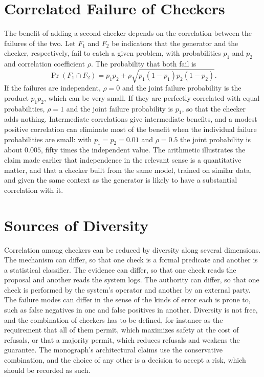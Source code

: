 \section{Correlated Failure of Checkers}

The benefit of adding a second checker depends on the correlation between the failures of the two. Let $F_1$ and $F_2$ be indicators that the generator and the checker, respectively, fail to catch a given problem, with probabilities $p_1$ and $p_2$ and correlation coefficient $\rho$. The probability that both fail is
\[
\Pr(F_1\cap F_2)=p_1p_2+\rho\sqrt{p_1(1-p_1)p_2(1-p_2)}.
\]
If the failures are independent, $\rho=0$ and the joint failure probability is the product $p_1p_2$, which can be very small. If they are perfectly correlated with equal probabilities, $\rho=1$ and the joint failure probability is $p_1$, so that the checker adds nothing. Intermediate correlations give intermediate benefits, and a modest positive correlation can eliminate most of the benefit when the individual failure probabilities are small: with $p_1=p_2=0.01$ and $\rho=0.5$ the joint probability is about $0.005$, fifty times the independent value. The arithmetic illustrates the claim made earlier that independence in the relevant sense is a quantitative matter, and that a checker built from the same model, trained on similar data, and given the same context as the generator is likely to have a substantial correlation with it.

\section{Sources of Diversity}

Correlation among checkers can be reduced by diversity along several dimensions. The mechanism can differ, so that one check is a formal predicate and another is a statistical classifier. The evidence can differ, so that one check reads the proposal and another reads the system logs. The authority can differ, so that one check is performed by the system's operator and another by an external party. The failure modes can differ in the sense of the kinds of error each is prone to, such as false negatives in one and false positives in another. Diversity is not free, and the combination of checkers has to be defined, for instance as the requirement that all of them permit, which maximizes safety at the cost of refusals, or that a majority permit, which reduces refusals and weakens the guarantee. The monograph's architectural claims use the conservative combination, and the choice of any other is a decision to accept a risk, which should be recorded as such.
